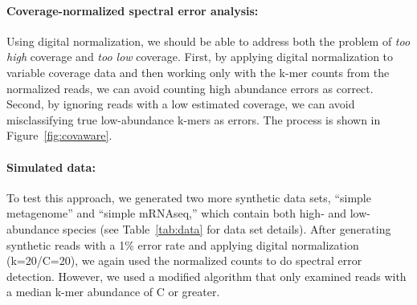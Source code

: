 \documentclass{article}
\begin{document}
\paragraph{Coverage-normalized spectral error analysis:}

Using digital normalization, we should be able to address both the
problem of {\em too high} coverage and {\em too low} coverage.
First, by applying digital normalization to variable
coverage data and then working only with the k-mer counts from the
normalized reads, we can avoid counting high abundance errors as
correct.
Second, by ignoring reads with a low estimated coverage, we can
avoid misclassifying true low-abundance k-mers as errors.  The process
is shown in Figure~\ref{fig:covaware}.


\paragraph{Simulated data:}
To test this approach, we generated two more synthetic data sets,
``simple metagenome'' and ``simple mRNAseq,'' which contain both high-
and low-abundance species (see Table~\ref{tab:data} for data set
details).  After generating synthetic reads with a 1\% error rate and
applying digital normalization (k=20/C=20), we again used the normalized
counts to do spectral error detection.  However, we used a modified
algorithm that only examined reads with a median k-mer abundance of C
or greater.

\end{document}
